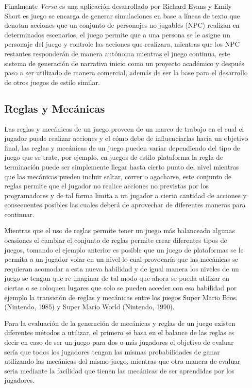 Finalmente \textit{Versu} es una aplicación desarrollado por Richard Evans y
Emily Short \cite{evans2013versu} es juego se encarga de generar simulaciones en
base a líneas de texto que denotan acciones que un conjunto de personajes no
jugables (NPC) realizan en determinados escenarios, el juego permite que a una
persona se le asigne un personaje del juego y controle las acciones que
realizara, mientras que los NPC restantes responderán de manera autónoma
mientras el juego continua, este sistema de generación de narrativa inicio como
un proyecto académico y después paso a ser utilizado de manera comercial, además
de ser la base para el desarrollo de otros juegos de estilo similar.

\subsection{Reglas y Mecánicas}
\label{subsection:rulesandmechanics}

Las reglas y mecánicas de un juego proveen de un marco de trabajo en el cual el
jugador puede realizar acciones y el cómo debe de influenciarlas hacia un
objetivo final, las reglas y mecánicas de un juego pueden variar dependiendo del
tipo de juego que se trate, por ejemplo, en juegos de estilo plataforma la regla
de terminación puede ser simplemente llegar hasta cierto punto del nivel
mientras que las mecánicas pueden incluir saltar, correr o agacharse, este
conjunto de reglas permite que el jugador no realice acciones no previstas por
los programadores y de tal forma limita a un jugador a cierta cantidad de
acciones y consecuentes posibles las cuales deberá de aprovechar de diferentes
maneras para continuar.

Mientras que el uso de reglas permite tener un juego más balanceado algunas
ocasiones el cambiar el conjunto de reglas permite crear diferentes tipos de
juegos, tomando el ejemplo anterior es posible que un juego de plataformas se le
permita a un jugador volar en un nivel lo cual provocaría que las mecánicas se
requieran acomodar a esta nueva habilidad y de igual manera los niveles de un
juego se tengan que re-imaginar de tal modo que ahora se pueda utilizar en
ciertas o se coloquen lugares que solo se pueden acceder con esa habilidad por
ejemplo la transición de reglas y mecánicas entre los juegos Super Mario Bros.
(Nintendo, 1985) y Super Mario World (Nintendo, 1990).

Para la evaluación de la generación de mecánicas y reglas de un juego existen
diferentes métodos a utilizar, el primero se basa en el balance de las reglas es
decir en caso de ser un juego para dos o más jugadores el objetivo de evaluar
sería que todos los jugadores tengan las mismas probabilidades de ganar
utilizando las mecánicas del mismo juego, mientras que otra manera de evaluar
seria mediante la facilidad que tienen las mecánicas de ser aprendidas por los
jugadores.

